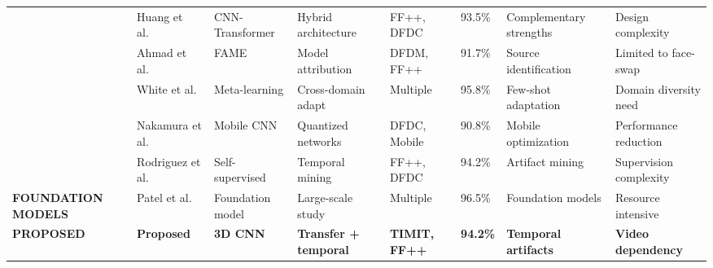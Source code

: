 \documentclass[conference]{IEEEtran}
\begin{document}
\begin{table*}[!htbp]
\begin{tabular}{|p{2.5cm}|p{2.0cm}|p{1.6cm}|p{2.0cm}|p{1.6cm}|p{0.7cm}|p{2.0cm}|p{2.0cm}|}
& Huang et al.~\cite{huang2024hybrid} & CNN-Transformer & Hybrid architecture & FF++, DFDC & 93.5\% & Complementary strengths & Design complexity \\ \cline{2-8}
& Ahmad et al.~\cite{ahmad2024fame} & FAME & Model attribution & DFDM, FF++ & 91.7\% & Source identification & Limited to face-swap \\ \cline{2-8}
& White et al.~\cite{white2025cross} & Meta-learning & Cross-domain adapt & Multiple & 95.8\% & Few-shot adaptation & Domain diversity need \\ \cline{2-8}
& Nakamura et al.~\cite{nakamura2024real} & Mobile CNN & Quantized networks & DFDC, Mobile & 90.8\% & Mobile optimization & Performance reduction \\ \cline{2-8}
& Rodriguez et al.~\cite{rodriguez2025temporal} & Self-supervised & Temporal mining & FF++, DFDC & 94.2\% & Artifact mining & Supervision complexity \\ \hline
\multirow{1}{2.5cm}{\textbf{FOUNDATION MODELS}} & Patel et al.~\cite{patel2025foundation} & Foundation model & Large-scale study & Multiple & 96.5\% & Foundation models & Resource intensive \\ \hline
\multirow{1}{2.5cm}{\textbf{\textbf{PROPOSED}}} & \textbf{Proposed} & \textbf{3D CNN} & \textbf{Transfer + temporal} & \textbf{TIMIT, FF++} & \textbf{94.2\%} & \textbf{Temporal artifacts} & \textbf{Video dependency} \\ \hline
\end{tabular}
\end{table*}



\end{document}
